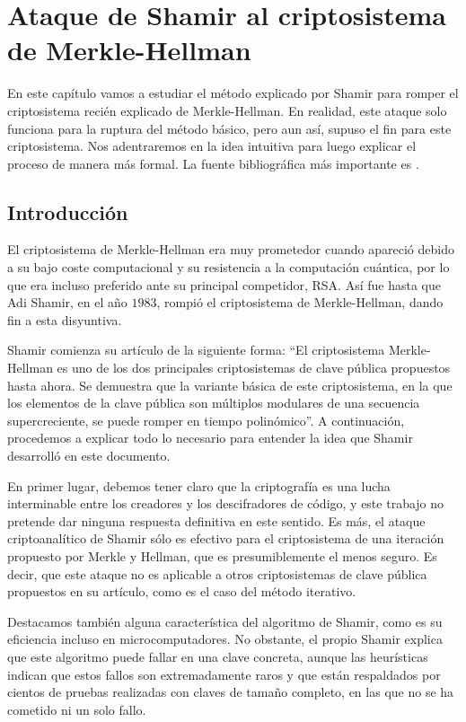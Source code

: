 \chapter{Ataque de Shamir al criptosistema de Merkle-Hellman} \label{ch:cuarto-capitulo}

    En este capítulo vamos a estudiar el método explicado por Shamir para romper el criptosistema recién explicado de Merkle-Hellman. En realidad, este ataque solo funciona para la ruptura del método básico, pero aun así, supuso el fin para este criptosistema. Nos adentraremos en la idea intuitiva para luego explicar el proceso de manera más formal. La fuente bibliográfica más importante es \cite{artSha}.
    
    \section{Introducción}

    El criptosistema de Merkle-Hellman era muy prometedor cuando apareció debido a su bajo coste computacional y su resistencia a la computación cuántica, por lo que era incluso preferido ante su principal competidor, RSA. Así fue hasta que Adi Shamir, en el año $1983$, rompió el criptosistema de Merkle-Hellman, dando fin a esta disyuntiva.

    Shamir comienza su artículo \cite{artSha} de la siguiente forma: ``El criptosistema Merkle-Hellman es uno de los dos principales criptosistemas de clave pública propuestos hasta ahora. Se demuestra que la variante básica de este criptosistema, en la que los elementos de la clave pública son múltiplos modulares de una secuencia supercreciente, se puede romper en tiempo polinómico''. A continuación, procedemos a explicar todo lo necesario para entender la idea que Shamir desarrolló en este documento.

    En primer lugar, debemos tener claro que la criptografía es una lucha interminable entre los creadores y los descifradores de código, y este trabajo no pretende dar ninguna respuesta definitiva en este sentido. Es más, el ataque criptoanalítico de Shamir sólo es efectivo para el criptosistema de una iteración propuesto por Merkle y Hellman, que es presumiblemente el menos seguro. Es decir, que este ataque no es aplicable a otros criptosistemas de clave pública propuestos en su artículo, como es el caso del método iterativo.

    Destacamos también alguna característica del algoritmo de Shamir, como es su eficiencia incluso en microcomputadores. No obstante, el propio Shamir explica que este algoritmo puede fallar en una clave concreta, aunque las heurísticas indican que estos fallos son extremadamente raros y que están respaldados por cientos de pruebas realizadas con claves de tamaño completo, en las que no se ha cometido ni un solo fallo.

